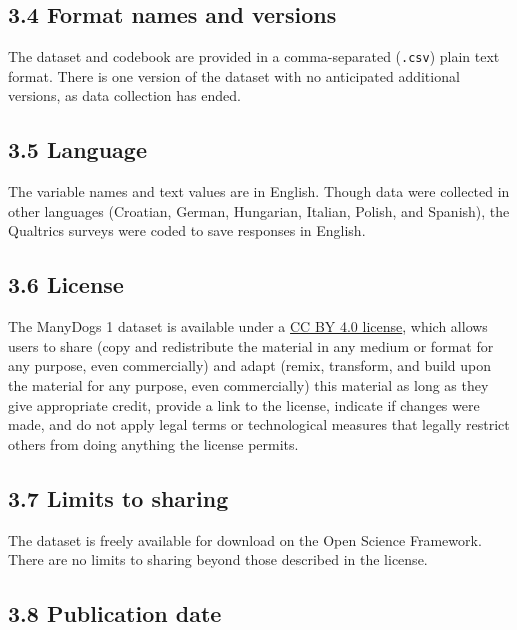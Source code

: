 \documentclass[
  man,floatsintext]{apa6}
\begin{document}
\hypertarget{format-names-and-versions}{%
\subsection{3.4 Format names and versions}\label{format-names-and-versions}}

The dataset and codebook are provided in a comma-separated (\texttt{.csv}) plain text format. There is one version of the dataset with no anticipated additional versions, as data collection has ended.

\hypertarget{language}{%
\subsection{3.5 Language}\label{language}}

The variable names and text values are in English. Though data were collected in other languages (Croatian, German, Hungarian, Italian, Polish, and Spanish), the Qualtrics surveys were coded to save responses in English.

\hypertarget{license}{%
\subsection{3.6 License}\label{license}}

The ManyDogs 1 dataset is available under a \href{https://creativecommons.org/licenses/by/4.0/}{CC BY 4.0 license}, which allows users to share (copy and redistribute the material in any medium or format for any purpose, even commercially) and adapt (remix, transform, and build upon the material for any purpose, even commercially) this material as long as they give appropriate credit, provide a link to the license, indicate if changes were made, and do not apply legal terms or technological measures that legally restrict others from doing anything the license permits.

\hypertarget{limits-to-sharing}{%
\subsection{3.7 Limits to sharing}\label{limits-to-sharing}}

The dataset is freely available for download on the Open Science Framework. There are no limits to sharing beyond those described in the license.

\hypertarget{publication-date}{%
\subsection{3.8 Publication date}\label{publication-date}}
\end{document}
